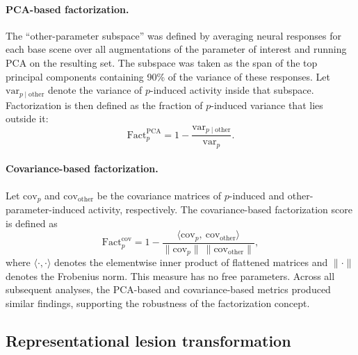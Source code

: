 \documentclass[11pt]{article}
\begin{document}
\paragraph{PCA-based factorization.}
The ``other-parameter subspace'' was defined by averaging neural responses
for each base scene over all augmentations of the parameter of interest and
running PCA on the resulting set. The subspace was taken as the span of the
top principal components containing 90\% of the variance of these responses.
Let \(\mathrm{var}_{p\mid\mathrm{other}}\) denote the variance of
\(p\)-induced activity inside that subspace. Factorization is then defined
as the fraction of \(p\)-induced variance that lies outside it:
\begin{equation}
\mathrm{Fact}_p^{\mathrm{PCA}}
= 1 - \frac{\mathrm{var}_{p\mid\mathrm{other}}}{\mathrm{var}_{p}}.
\end{equation}

\paragraph{Covariance-based factorization.}
Let \(\mathrm{cov}_{p}\) and \(\mathrm{cov}_{\mathrm{other}}\) be the
covariance matrices of \(p\)-induced and other-parameter-induced activity,
respectively. The covariance-based factorization score is defined as
\begin{equation}
\mathrm{Fact}_p^{\mathrm{cov}}
= 1 - \frac{\langle \mathrm{cov}_{p},\ \mathrm{cov}_{\mathrm{other}}\rangle}
{\lVert \mathrm{cov}_{p}\rVert\ \lVert \mathrm{cov}_{\mathrm{other}}\rVert},
\end{equation}
where \(\langle\cdot,\cdot\rangle\) denotes the elementwise inner product of
flattened matrices and \(\lVert\cdot\rVert\) denotes the Frobenius norm.
This measure has no free parameters. Across all subsequent analyses, the
PCA-based and covariance-based metrics produced similar findings, supporting
the robustness of the factorization concept.

\subsection{Representational lesion transformation}
\end{document}
